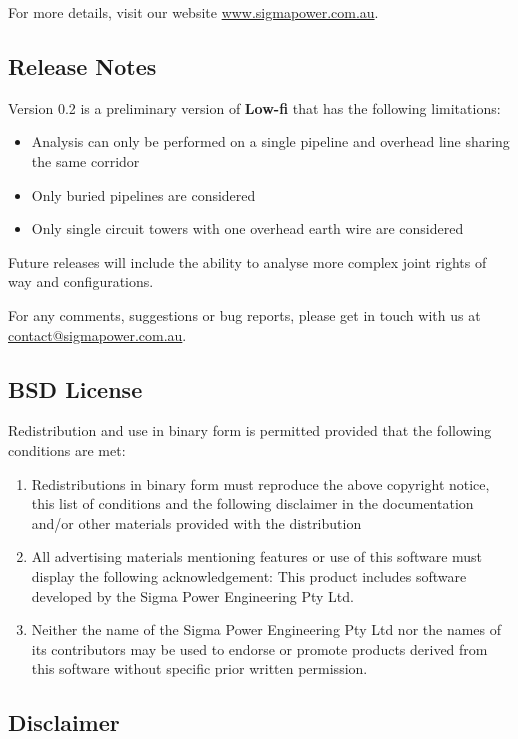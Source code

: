 \documentclass{article}
\begin{document}
For more details, visit our website \href{http://www.sigmapower.com.au}{www.sigmapower.com.au}.

\subsection{Release Notes}
Version 0.2 is a preliminary version of \textbf{Low-fi} that has the following limitations:

\begin{itemize}
\item Analysis can only be performed on a single pipeline and overhead line sharing the same corridor
\item Only buried pipelines are considered
\item Only single circuit towers with one overhead earth wire are considered
\end{itemize} 

Future releases will include the ability to analyse more complex joint rights of way and configurations.

For any comments, suggestions or bug reports, please get in touch with us at \href{mailto:contact@sigmapower.com.au}{contact@sigmapower.com.au}.

\subsection{BSD License}
Redistribution and use in  binary form is permitted provided that the following conditions are met:

\begin{enumerate}
\item Redistributions in binary form must reproduce the above copyright notice, this list of conditions and the following disclaimer in the documentation and/or other materials provided with the distribution
\item All advertising materials mentioning features or use of this software must display the following acknowledgement: This product includes software developed by the Sigma Power Engineering Pty Ltd.
\item Neither the name of the Sigma Power Engineering Pty Ltd nor the names of its contributors may be used to endorse or promote products derived from this software without specific prior written permission.
\end{enumerate}

\subsection{Disclaimer}
\end{document}
